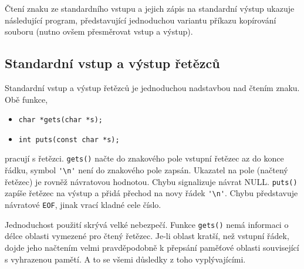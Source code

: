          
      
      \begin{example}Čtení znaku ze standardního vstupu a jejich zápis na standardní výstup 
        ukazuje následující program, představující jednoduchou variantu příkazu kopírování souboru 
        (nutno ovšem přesměrovat vstup a výstup).
  
        
      \end{example}
      
    \subsection{Standardní vstup a výstup řetězců}
      Standardní vstup a výstup řetězců je jednoduchou nadstavbou nad čtením znaku. Obě funkce,
      \begin{itemize}
        \item \lstinline[basicstyle=\ttfamily]!char *gets(char *s);!
        \item \lstinline[basicstyle=\ttfamily]!int puts(const char *s);!
      \end{itemize}
      pracují s řetězci. \texttt{gets()} načte do znakového pole vstupní řetězec az do konce řádku, 
      symbol  \lstinline[basicstyle=\ttfamily]!'\n'! není do znakového pole zapsán. Ukazatel na 
      pole (načtený řetězec) je rovněž návratovou hodnotou. Chybu signalizuje návrat NULL. 
      \texttt{puts()} 
      zapíše řetězec na výstup a přidá přechod na novy řádek       
      \lstinline[basicstyle=\ttfamily]!'\n'!. Chybu představuje návratové \texttt{EOF}, jinak vrací 
      kladné cele číslo.
  
      Jednoduchost použití skrývá velké nebezpečí. Funkce \texttt{gets()} nemá informaci o délce 
      oblasti vymezené pro čtený řetězec. Je-li oblast kratší, než vstupní řádek, dojde jeho 
      načtením velmi pravděpodobně k přepsání paměťové oblasti související s vyhrazenou pamětí. A 
      to se všemi důsledky z toho vyplývajícími.
  
